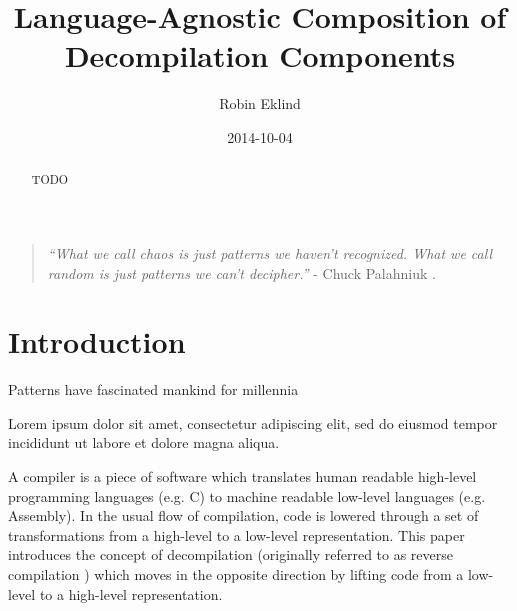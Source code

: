 \documentclass[12pt, a4paper]{article}
\title{Language-Agnostic Composition of Decompilation Components}
\author{Robin Eklind}
\date{2014-10-04}
\begin{document}
\maketitle

\begin{abstract}
TODO
\end{abstract}

\vfill

\begin{quote}
	\textit{``What we call chaos is just patterns we haven't recognized. What we call random is just patterns we can't decipher.''} - Chuck Palahniuk \cite{patterns_quote}.
\end{quote}

\pagebreak

\tableofcontents

\pagebreak



\section{Introduction}

Patterns have fascinated mankind for millennia

Lorem ipsum dolor sit amet, consectetur adipiscing elit, sed do eiusmod tempor incididunt ut labore et dolore magna aliqua.

A compiler is a piece of software which translates human readable high-level programming languages (e.g. C) to machine readable low-level languages (e.g. Assembly). In the usual flow of compilation, code is lowered through a set of transformations from a high-level to a low-level representation. This paper introduces the concept of decompilation (originally referred to as reverse compilation \cite{rev_comp}) which moves in the opposite direction by lifting code from a low-level to a high-level representation.



\end{document}
